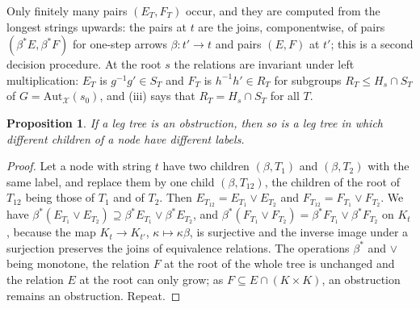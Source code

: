 \documentclass[11pt]{amsart}
\newtheorem{prop}[thm]{Proposition}
\theoremstyle{definition}
\newcommand{\Aut}{\mathrm{Aut}}
\newcommand{\cX}{\mathcal X}
\begin{document}
Only finitely many pairs $(E_T,F_T)$ occur, and they are computed
from the longest strings upwards: the pairs at $t$ are the joins,
componentwise, of pairs $(\beta^*E,\beta^*F)$ for one-step arrows
$\beta\colon t'\to t$ and pairs $(E,F)$ at $t'$; this is a
second decision procedure. At the root $s$ the relations are
invariant under left multiplication: $E_T$ is $g^{-1}g'\in S_T$ and
$F_T$ is $h^{-1}h'\in R_T$ for subgroups $R_T\le H_s\cap S_T$ of
$G=\Aut_{\cX}(s_0)$, and (iii) says that $R_T=H_s\cap S_T$ for all
$T$.

\begin{prop}\label{prop:reduced}
If a leg tree is an obstruction, then so is a leg tree in which
different children of a node have different labels.
\end{prop}
\begin{proof}
Let a node with string $t$ have two children $(\beta,T_1)$ and
$(\beta,T_2)$ with the same label, and replace them by one child
$(\beta,T_{12})$, the children of the root of $T_{12}$ being those of
$T_1$ and of $T_2$. Then $E_{T_{12}}=E_{T_1}\vee E_{T_2}$ and
$F_{T_{12}}=F_{T_1}\vee F_{T_2}$. We have $\beta^*(E_{T_1}\vee E_{T_2})
\supseteq\beta^*E_{T_1}\vee\beta^*E_{T_2}$, and $\beta^*(F_{T_1}\vee
F_{T_2})=\beta^*F_{T_1}\vee\beta^*F_{T_2}$ on $K_t$, because the map
$K_t\to K_{t'}$, $\kappa\mapsto\kappa\beta$, is surjective and the
inverse image under a surjection preserves the joins of equivalence
relations. The operations $\beta^*$ and $\vee$ being monotone, the
relation $F$ at the root of the whole tree is unchanged and the
relation $E$ at the root can only grow; as $F\subseteq E\cap(K\times
K)$, an obstruction remains an obstruction. Repeat.
\end{proof}
\end{document}
